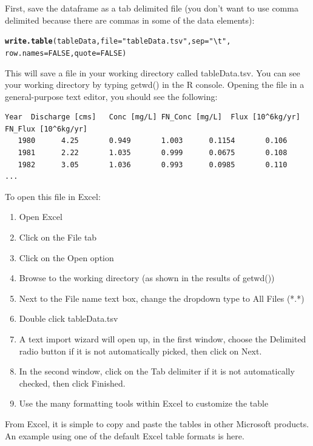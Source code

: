 \documentclass[a4paper,11pt]{article}\usepackage{graphicx, color}
\makeatletter
\newcommand{\hlfunctioncall}[1]{\textcolor[rgb]{0.501960784313725,0,0.329411764705882}{\textbf{#1}}}%
\newcommand{\hlstring}[1]{\textcolor[rgb]{0.6,0.6,1}{#1}}%
\newenvironment{kframe}{%
 \def\at@end@of@kframe{}%
 \ifinner\ifhmode%
  \def\at@end@of@kframe{\end{minipage}}%
  \begin{minipage}{\columnwidth}%
 \fi\fi%
 \def\FrameCommand##1{\hskip\@totalleftmargin \hskip-\fboxsep
 \colorbox{shadecolor}{##1}\hskip-\fboxsep
     \hskip-\linewidth \hskip-\@totalleftmargin \hskip\columnwidth}%
 \MakeFramed {\advance\hsize-\width
   \@totalleftmargin\z@ \linewidth\hsize
   \@setminipage}}%
 {\par\unskip\endMakeFramed%
 \at@end@of@kframe}
\newenvironment{knitrout}{}{} %
\makeatother
\begin{document}
First, save the dataframe as a tab delimited file (you don't want to use comma delimited because there are commas in some of the data elements):


\begin{knitrout}
\color{fgcolor}\begin{kframe}
\begin{alltt}
\hlfunctioncall{write.table}(tableData, file=\hlstring{"tableData.tsv"},sep=\hlstring{"\textbackslash{}t"}, 
            row.names = FALSE,quote=FALSE)
\end{alltt}
\end{kframe}
\end{knitrout}


This will save a file in your working directory called tableData.tsv.  You can see your working directory by typing getwd() in the R console. Opening the file in a general-purpose text editor, you should see the following:

\begin{verbatim}
Year  Discharge [cms]	Conc [mg/L]	FN_Conc [mg/L]	Flux [10^6kg/yr]	FN_Flux [10^6kg/yr]
   1980	     4.25	    0.949	    1.003	   0.1154	    0.106
   1981	     2.22	    1.035	    0.999	   0.0675	    0.108
   1982	     3.05	    1.036	    0.993	   0.0985	    0.110
...
\end{verbatim}

To open this file in Excel:
\begin{enumerate}
\item Open Excel
\item Click on the File tab
\item Click on the Open option
\item Browse to the working directory (as shown in the results of getwd())
\item Next to the File name text box, change the dropdown type to All Files (*.*)
\item Double click tableData.tsv
\item A text import wizard will open up, in the first window, choose the Delimited radio button if it is not automatically picked, then click on Next.
\item In the second window, click on the Tab delimiter if it is not automatically checked, then click Finished.
\item Use the many formatting tools within Excel to customize the table
\end{enumerate}

From Excel, it is simple to copy and paste the tables in other Microsoft products. An example using one of the default Excel table formats is here.
\end{document}
